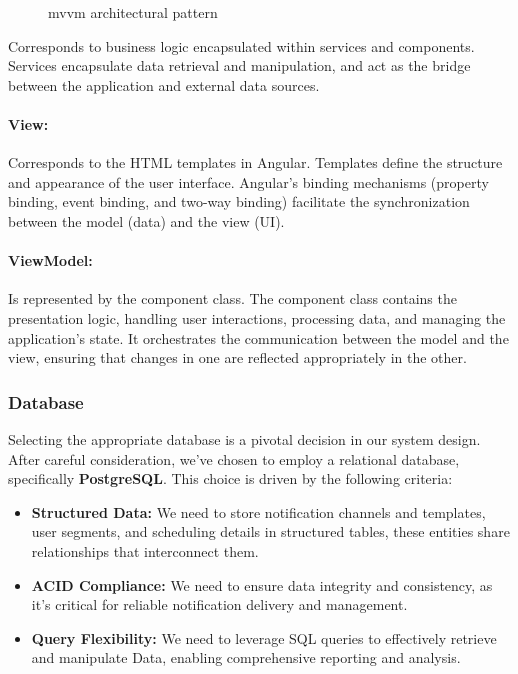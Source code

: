 \begin{figure}[hbt!]
      \centering
      
      \caption{\acrshort{mvvm} architectural pattern}
      \label{mvvm}
\end{figure}

 Corresponds to business logic encapsulated within services and components.
Services encapsulate data retrieval and manipulation, and act as the bridge between
the application and external data sources.

\paragraph*{View:} Corresponds to the HTML templates in Angular. Templates define the structure and
appearance of the user interface. Angular's binding mechanisms (property binding, event binding,
and two-way binding) facilitate the synchronization between the model (data) and the view (UI).

\paragraph*{ViewModel:} Is represented by the component class. The component class contains
the presentation logic, handling user interactions, processing data, and managing the application's state.
It orchestrates the communication between the model and the view, ensuring that changes in one are
reflected appropriately in the other.

\subsubsection{Database}
Selecting the appropriate database is a pivotal decision in our system design. After careful consideration,
we've chosen to employ a relational database, specifically \textbf{PostgreSQL}. This choice is driven by the
following criteria:

\begin{itemize}
      \item \textbf{Structured Data:} We need to store notification channels and templates, user segments,
            and scheduling details in structured tables, these entities share relationships that
            interconnect them.
      \item \textbf{ACID Compliance:} We need to ensure data integrity and consistency, as it's critical
            for reliable notification delivery and management.
      \item \textbf{Query Flexibility:} We need to leverage SQL queries to effectively retrieve and manipulate
            Data, enabling comprehensive reporting and analysis.
\end{itemize}

